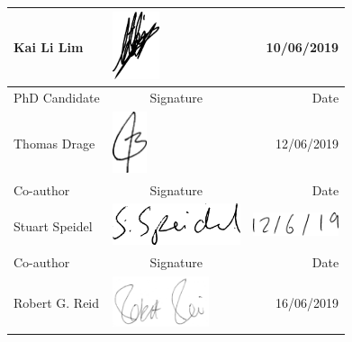 \begin{table}[ht]
	\centering
	\renewcommand{\arraystretch}{.1} %
	\floatsep -10cm
	\begin{tabular}{p{}p{}p{}}
		Kai Li Lim                  & \centering\vspace{-2cm}\includegraphics[height=2cm]{Declaration/Img/kaili.pdf}                    & \multicolumn{1}{r}{10/06/2019}     \\ \midrule
		PhD Candidate               & \multicolumn{1}{c}{Signature} & \multicolumn{1}{r}{Date} \\[0.2cm]
		Thomas Drage                & \centering\includegraphics[height=1.8cm]{Declaration/Img/td.png}                   & \multicolumn{1}{r}{12/06/2019}     \\ \midrule
		Co-author                   & \multicolumn{1}{c}{Signature} & \multicolumn{1}{r}{Date} \\[0.8cm]
		Stuart Speidel              & \centering\includegraphics[height=1.2cm]{Declaration/Img/speidel.png}                    & \multicolumn{1}{r}{\hspace{-5cm}\includegraphics[height=0.7cm]{Declaration/Img/speideld.png} }     \\ \midrule
		Co-author                   & \multicolumn{1}{c}{Signature} & \multicolumn{1}{r}{Date} \\[0.5cm]
		Robert G. Reid              & \centering\includegraphics[height=1.5cm]{Declaration/Img/rr.jpg}                    & \multicolumn{1}{r}{16/06/2019}     \\ \midrule

\end{tabular}
\end{table}
